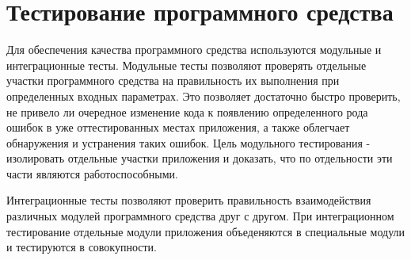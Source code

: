 \section{Тестирование программного средства}
\label{sec:test}

Для обеспечения качества программного средства используются модульные и интеграционные тесты. Модульные тесты позволяют проверять отдельные участки программного средства на правильность их выполнения при определенных входных параметрах. Это позволяет достаточно быстро проверить, не привело ли очередное изменение кода к появлению определенного рода ошибок в уже оттестированных местах приложения, а также облегчает обнаружения и устранения таких ошибок. Цель модульного тестирования - изолировать отдельные участки приложения и доказать, что по отдельности эти части являются работоспособными. 

Интеграционные тесты позволяют проверить правильность взаимодействия различных модулей программного средства друг с другом. При интеграционном тестирование отдельные модули приложения объеденяются в специальные модули и тестируются в совокупности.

